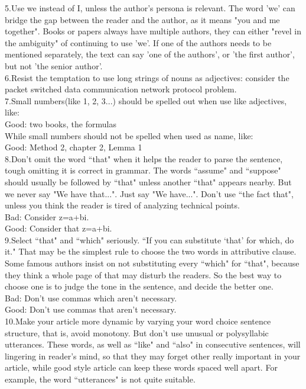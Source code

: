 \documentclass[]{article}
\begin{document}
	\noindent5.Use we instead of I, unless the author's persona is relevant. The word 'we' can bridge the gap between the reader and the author, as it means "you and me together". Books or papers always have multiple authors, they can either "revel in the ambiguity" of continuing to use 'we'. If one of the authors needs to be mentioned separately, the text can say 'one of the authors', or 'the first author', but not 'the senior author'. \\
	
	\noindent6.Resist the temptation to use long strings of nouns as adjectives:  consider the packet switched data communication network protocol problem.\\
	
	\noindent7.Small numbers(like 1, 2, 3...) should be spelled out when use like adjectives, like: \\
	\indent Good: two books, the formulas\\
	While small numbers should not be spelled when used as name, like: \\
	\indent Good: Method 2, chapter 2, Lemma 1\\
	
	\noindent8.Don't omit the word ``that" when it helps the reader to parse the sentence, tough omitting it is correct in grammar. The words ``assume" and ``suppose" should usually be followed by ``that" unless another ``that" appears nearby. But we never say "We have that...". Just say "We have...". Don't use ``the fact that", unless you think the reader is tired of analyzing technical points.\\
	\indent Bad: Consider z=a+bi.\\
	\indent Good: Consider that z=a+bi.\\
	
	\noindent9.Select ``that" and ``which" seriously. ``If you can substitute `that' for which, do it." That may be the simplest rule to choose the two words in attributive clause. Some famous authors insist on not substituting every ``which" for ``that", because they think a whole page of that may disturb the readers. So the best way to choose one is to judge the tone in the sentence, and decide the better one.\\
	\indent Bad: Don't use commas which aren't necessary.\\
	\indent Good: Don't use commas that aren't necessary.\\
	
	\noindent10.Make your article more dynamic by varying your word choice sentence structure, that is, avoid monotony. But don't use unusual or polysyllabic utterances. These words, as well as ``like" and ``also" in consecutive sentences, will lingering in reader's mind, so that they may forget other really important in your article, while good style article can keep these words spaced well apart. For example, the word ``utterances" is not quite suitable. \\
	
\end{document}

